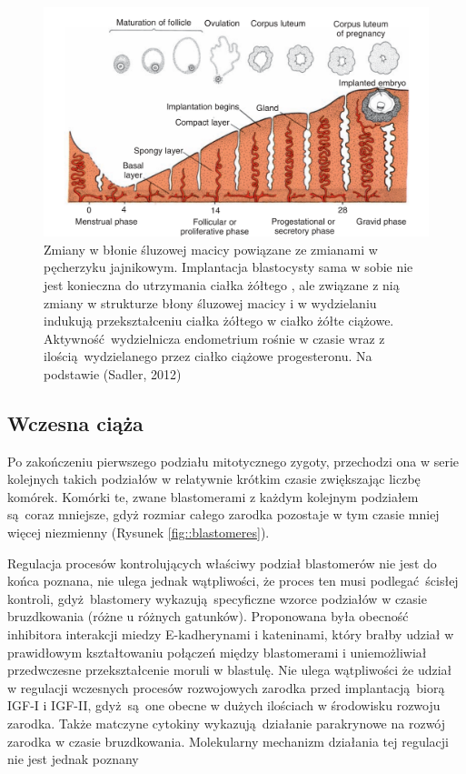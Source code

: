 \documentclass[two column, twoside, a4paper]{article}
\begin{document}
 \begin{figure}[ht!]
	 \begin{tcolorbox}
		 \centering
		 \includegraphics[width=\textwidth]{./figures/endometrium.png}
		 \caption{Zmiany w błonie śluzowej macicy powiązane ze zmianami w pęcherzyku jajnikowym. Implantacja blastocysty sama w sobie nie jest konieczna do utrzymania ciałka żółtego \autocite{Krzymowski2005}, ale związane z nią zmiany w strukturze błony śluzowej macicy i w wydzielaniu indukują przekształceniu ciałka żółtego w ciałko żółte ciążowe. Aktywność wydzielnicza endometrium rośnie w czasie wraz z ilością wydzielanego przez ciałko ciążowe progesteronu. Na podstawie (Sadler, 2012)}\label{fig::endometrium}
	\end{tcolorbox}
\end{figure}

\subsection{Wczesna ciąża}

Po zakończeniu pierwszego podziału mitotycznego zygoty, przechodzi ona w serie kolejnych takich podziałów w relatywnie krótkim czasie zwiększając liczbę komórek. Komórki te, zwane blastomerami z każdym kolejnym podziałem są coraz mniejsze, gdyż rozmiar całego zarodka pozostaje w tym czasie mniej więcej niezmienny (Rysunek \ref{fig::blastomeres}).

Regulacja procesów kontrolujących właściwy podział blastomerów nie jest do końca poznana, nie ulega jednak wątpliwości, że proces ten musi podlegać ścisłej kontroli, gdyż blastomery wykazują specyficzne wzorce podziałów w czasie bruzdkowania (różne u różnych gatunków). Proponowana była obecność inhibitora interakcji miedzy E-kadherynami i kateninami, który brałby udział w prawidłowym kształtowaniu połączeń między blastomerami i uniemożliwiał przedwczesne przekształcenie moruli w blastulę. Nie ulega wątpliwości że udział w regulacji wczesnych procesów rozwojowych zarodka przed implantacją biorą IGF-I i IGF-II, gdyż są one obecne w dużych ilościach w środowisku rozwoju zarodka. Także matczyne cytokiny wykazują działanie parakrynowe na rozwój zarodka w czasie bruzdkowania. Molekularny mechanizm działania tej regulacji nie jest jednak poznany \autocite{Sadler2012, Bielanska2001, Watson2004}
\end{document}

